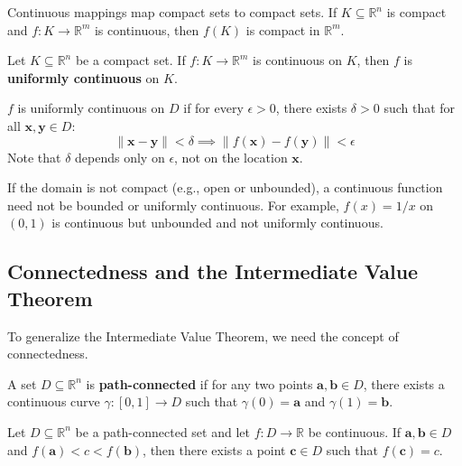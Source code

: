 \begin{theorem}
Continuous mappings map compact sets to compact sets. If $K \subseteq \mathbb{R}^n$ is compact and $f: K \to \mathbb{R}^m$ is continuous, then $f(K)$ is compact in $\mathbb{R}^m$.
\end{theorem}

\begin{theorem}
Let $K \subseteq \mathbb{R}^n$ be a compact set. If $f: K \to \mathbb{R}^m$ is continuous on $K$, then $f$ is \textbf{uniformly continuous} on $K$.
\end{theorem}

\begin{definition}
$f$ is uniformly continuous on $D$ if for every $\epsilon > 0$, there exists $\delta > 0$ such that for all $\mathbf{x}, \mathbf{y} \in D$:
\[ \|\mathbf{x} - \mathbf{y}\| < \delta \implies \|f(\mathbf{x}) - f(\mathbf{y})\| < \epsilon \]
Note that $\delta$ depends only on $\epsilon$, not on the location $\mathbf{x}$.
\end{definition}

\newpage

\begin{remark}
If the domain is not compact (e.g., open or unbounded), a continuous function need not be bounded or uniformly continuous.
For example, $f(x) = 1/x$ on $(0, 1)$ is continuous but unbounded and not uniformly continuous.
\end{remark}

\subsection{Connectedness and the Intermediate Value Theorem}

To generalize the Intermediate Value Theorem, we need the concept of connectedness.

\begin{definition}
A set $D \subseteq \mathbb{R}^n$ is \textbf{path-connected} if for any two points $\mathbf{a}, \mathbf{b} \in D$, there exists a continuous curve $\gamma: [0, 1] \to D$ such that $\gamma(0) = \mathbf{a}$ and $\gamma(1) = \mathbf{b}$.
\end{definition}

\begin{theorem}
Let $D \subseteq \mathbb{R}^n$ be a path-connected set and let $f: D \to \mathbb{R}$ be continuous. If $\mathbf{a}, \mathbf{b} \in D$ and $f(\mathbf{a}) < c < f(\mathbf{b})$, then there exists a point $\mathbf{c} \in D$ such that $f(\mathbf{c}) = c$.
\end{theorem}

